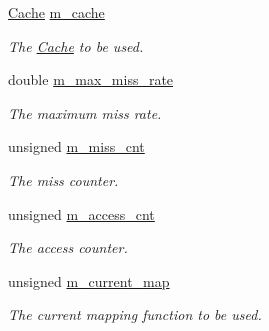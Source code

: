\begin{DoxyCompactItemize}
\item 
\hyperlink{classCache}{Cache} \hyperlink{classMappingSimulator_a5a8a438a167ea70c9aee70635d0ae06a}{m\+\_\+cache}\hypertarget{classMappingSimulator_a5a8a438a167ea70c9aee70635d0ae06a}{}\label{classMappingSimulator_a5a8a438a167ea70c9aee70635d0ae06a}

\begin{DoxyCompactList}\small\item\em The \hyperlink{classCache}{Cache} to be used. \end{DoxyCompactList}\item 
double \hyperlink{classMappingSimulator_a4636c2178965082cb9dbd78db7e98082}{m\+\_\+max\+\_\+miss\+\_\+rate}\hypertarget{classMappingSimulator_a4636c2178965082cb9dbd78db7e98082}{}\label{classMappingSimulator_a4636c2178965082cb9dbd78db7e98082}

\begin{DoxyCompactList}\small\item\em The maximum miss rate. \end{DoxyCompactList}\item 
unsigned \hyperlink{classMappingSimulator_af2b6441ab194ede9936224c4797c66f0}{m\+\_\+miss\+\_\+cnt}\hypertarget{classMappingSimulator_af2b6441ab194ede9936224c4797c66f0}{}\label{classMappingSimulator_af2b6441ab194ede9936224c4797c66f0}

\begin{DoxyCompactList}\small\item\em The miss counter. \end{DoxyCompactList}\item 
unsigned \hyperlink{classMappingSimulator_a8ab92a05774ab4a3ca35e2f299f58fc6}{m\+\_\+access\+\_\+cnt}\hypertarget{classMappingSimulator_a8ab92a05774ab4a3ca35e2f299f58fc6}{}\label{classMappingSimulator_a8ab92a05774ab4a3ca35e2f299f58fc6}

\begin{DoxyCompactList}\small\item\em The access counter. \end{DoxyCompactList}\item 
unsigned \hyperlink{classMappingSimulator_a77842beb2b039500a9d7459854fe4af1}{m\+\_\+current\+\_\+map}\hypertarget{classMappingSimulator_a77842beb2b039500a9d7459854fe4af1}{}\label{classMappingSimulator_a77842beb2b039500a9d7459854fe4af1}

\begin{DoxyCompactList}\small\item\em The current mapping function to be used. \end{DoxyCompactList}\end{DoxyCompactItemize}


